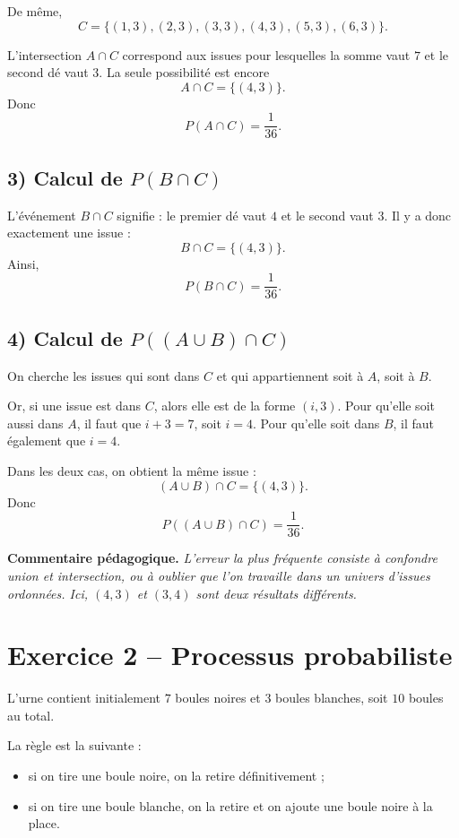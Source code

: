 \documentclass[12pt,a4paper]{article}
\newenvironment{pedago}
{\par\smallskip\noindent\textbf{Commentaire pédagogique. }\itshape}
{\par\smallskip}
\begin{document}
De même,
\[
C=\{(1,3),(2,3),(3,3),(4,3),(5,3),(6,3)\}.
\]

L'intersection $A\cap C$ correspond aux issues pour lesquelles la somme vaut $7$ et le second dé vaut $3$. La seule possibilité est encore
\[
A\cap C=\{(4,3)\}.
\]
Donc
\[
P(A\cap C)=\frac{1}{36}.
\]

\subsection*{3) Calcul de $P(B\cap C)$}

L'événement $B\cap C$ signifie : le premier dé vaut $4$ et le second vaut $3$. Il y a donc exactement une issue :
\[
B\cap C=\{(4,3)\}.
\]
Ainsi,
\[
P(B\cap C)=\frac{1}{36}.
\]

\subsection*{4) Calcul de $P((A\cup B)\cap C)$}

On cherche les issues qui sont dans $C$ et qui appartiennent soit à $A$, soit à $B$.

Or, si une issue est dans $C$, alors elle est de la forme $(i,3)$. Pour qu'elle soit aussi dans $A$, il faut que $i+3=7$, soit $i=4$. Pour qu'elle soit dans $B$, il faut également que $i=4$.

Dans les deux cas, on obtient la même issue :
\[
(A\cup B)\cap C=\{(4,3)\}.
\]
Donc
\[
P((A\cup B)\cap C)=\frac{1}{36}.
\]

\begin{pedago}
L'erreur la plus fréquente consiste à confondre union et intersection, ou à oublier que l'on travaille dans un univers d'issues ordonnées. Ici, $(4,3)$ et $(3,4)$ sont deux résultats différents.
\end{pedago}

\bigskip

\section*{Exercice 2 -- Processus probabiliste}

L'urne contient initialement $7$ boules noires et $3$ boules blanches, soit $10$ boules au total.

La règle est la suivante :
\begin{itemize}[leftmargin=1.2cm]
    \item si on tire une boule noire, on la retire définitivement ;
    \item si on tire une boule blanche, on la retire et on ajoute une boule noire à la place.
\end{itemize}
\end{document}
